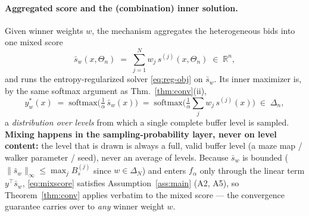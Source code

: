 \documentclass[11pt]{article}
\newcommand{\reals}{\mathbb{R}}
\newcommand{\simplex}{\Delta}
\newcommand{\levelset}{\Theta}     %
\newcommand{\param}{x}             %
\newcommand{\dist}{y}              %
\newcommand{\score}{s}             %
\begin{document}
\paragraph{Aggregated score and the (combination) inner solution.}
Given winner weights $w$, the mechanism aggregates the heterogeneous bids into one mixed score
\begin{equation}
  \bar\score_w(\param,\levelset_n)\;=\;\sum_{j=1}^{N} w_j\,\score^{(j)}(\param,\levelset_n)\;\in\;\reals^n,
  \label{eq:mixscore}
\end{equation}
and runs the entropy-regularized solver \eqref{eq:reg-obj} on $\bar\score_w$. Its inner maximizer is, by the same softmax argument as Thm.~\ref{thm:conv}(ii),
\begin{equation}
  \dist^{*}_w(\param)\;=\;\mathrm{softmax}\!\Big(\tfrac{1}{\alpha}\,\bar\score_w(\param)\Big)
  \;=\;\mathrm{softmax}\!\Big(\tfrac{1}{\alpha}\textstyle\sum_j w_j\,\score^{(j)}(\param)\Big)\;\in\;\simplex_n,
  \label{eq:mixsolution}
\end{equation}
a \emph{distribution over levels} from which a single complete buffer level is sampled. \textbf{Mixing happens in the sampling-probability layer, never on level content:} the level that is drawn is always a full, valid buffer level (a maze map / walker parameter / seed), never an average of levels. Because $\bar\score_w$ is bounded ($\|\bar\score_w\|_\infty\le\max_j B_s^{(j)}$ since $w\in\simplex_N$) and enters $f_\alpha$ only through the linear term $\dist^{\top}\bar\score_w$, \eqref{eq:mixscore} satisfies Assumption~\ref{ass:main} (A2, A5), so Theorem~\ref{thm:conv} applies verbatim to the mixed score --- the convergence guarantee carries over to \emph{any} winner weight $w$.
\end{document}
